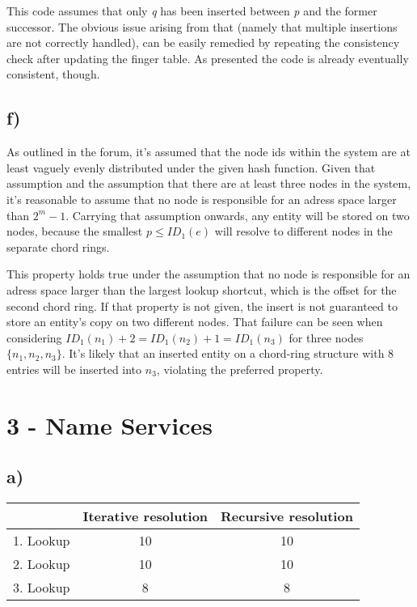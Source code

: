 \documentclass{scrartcl}
\begin{document}
This code assumes that only \textit{q} has been inserted between \textit{p} and the former successor.
The obvious issue arising from that (namely that multiple insertions are not correctly handled), can be easily remedied by repeating the consistency check after updating the finger table.
As presented the code is already eventually consistent, though.

\subsection*{f)}

As outlined in the forum, it's assumed that the node ids within the system are at least vaguely evenly distributed under the given hash function.
Given that assumption and the assumption that there are at least three nodes in the system, it's reasonable to assume that no node is responsible for an adress space larger than \(2^m-1\).
Carrying that assumption onwards, any entity will be stored on two nodes, because the smallest \(p \leq ID_1(e)\) will resolve to different nodes in the separate chord rings.

This property holds true under the assumption that no node is responsible for an adress space larger than the largest lookup shortcut, which is the offset for the second chord ring.
If that property is not given, the insert is not guaranteed to store an entity's copy on two different nodes.
That failure can be seen when considering \(ID_1(n_1) + 2 = ID_1(n_2) + 1 = ID_1(n_3)\) for three nodes \(\{n_1, n_2, n_3\}\).
It's likely that an inserted entity on a chord-ring structure with 8 entries will be inserted into \(n_3\), violating the preferred property.

\section*{3 - Name Services}

\subsection*{a)}
\begin{center}
	\begin{tabular}{|c|c|c|}
		\hline
		& Iterative resolution & Recursive resolution \\ \hline
		1. Lookup & 10 & 10 \\ \hline
		2. Lookup & 10 & 10 \\ \hline
		3. Lookup & 8 & 8 \\ \hline
	\end{tabular}
\end{center}
\end{document}
